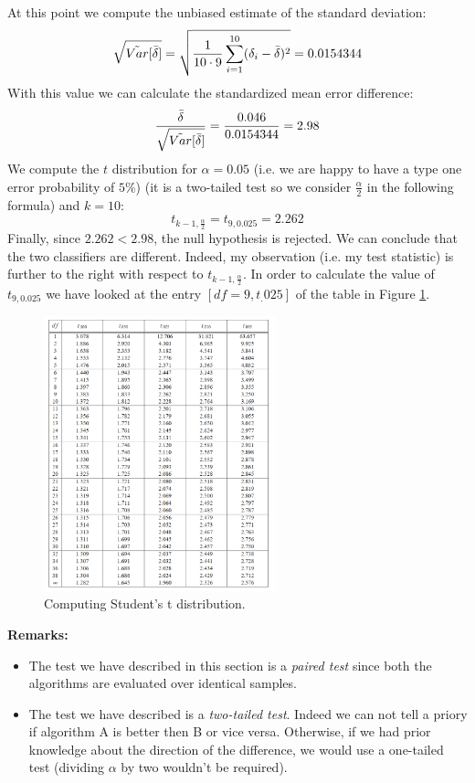 At this point we compute the unbiased estimate of the standard deviation:
\[
	\sqrt{\tilde{Var}[\Bar{\delta}]}= \sqrt{\frac{1}{10 \cdot 9}\sum_{i=1}^{10}(\delta_{i}-
	\Bar{\delta})^{2}}= 0.0154344
\]
With this value we can calculate the standardized mean error difference:
\[
	\frac{\Bar{\delta}}{\sqrt{\tilde{Var}[\Bar{\delta}]}}= \frac{0.046}{0.0154344}=
	2.98
\]
We compute the $t$ distribution for $\alpha=0.05$ (i.e. we are happy to have a type
one error probability of $5\%$) (it is a two-tailed test so we consider $\frac{\alpha}{2}$
in the following formula) and $k=10$:
\[
	t_{k-1, \frac{\alpha}{2}}= t_{9,0.025}= 2.262
\]
Finally, since $2.262 < 2.98$, the null hypothesis is rejected. We can conclude
that the two classifiers are different. Indeed, my observation (i.e. my test
statistic) is further to the right with respect to $t_{k-1, \frac{\alpha}{2}}$.
In order to calculate the value of $t_{9,0.025}$ we have looked at the entry
$[d f = 9, t_{.}025]$ of the table in Figure \ref{fig:tDistributionTable}.
\newline

\begin{figure}[H]
	\centering
	\includegraphics[width=0.6\textwidth]{
        images/06_Evaluation_tDistribution.png
    }
	\caption{Computing Student's t distribution.}
	\label{fig:tDistributionTable}
\end{figure}

\textbf{Remarks:}
\begin{itemize}
	\item The test we have described in this section is a \textit{paired test}
		since both the algorithms are evaluated over identical samples.

	\item The test we have described is a \textit{two-tailed test}. Indeed we can not
		tell a priory if algorithm A is better then B or vice versa. Otherwise, if we
		had prior knowledge about the direction of the difference, we would use a
		one-tailed test (dividing $\alpha$ by two wouldn't be required).
\end{itemize}
